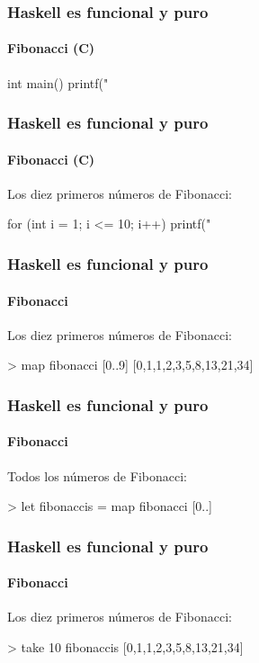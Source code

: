 \documentclass[spanish]{beamer}
\begin{document}

\begin{frame}[fragile]
  \frametitle{Haskell es funcional y puro}
  \framesubtitle{Fibonacci (C)}

  \begin{code}
int main() {
  printf("%
}
  \end{code}
\end{frame}


\begin{frame}[fragile]
  \frametitle{Haskell es funcional y puro}
  \framesubtitle{Fibonacci (C)}

  Los diez primeros números de Fibonacci:
  \begin{code}
for (int i = 1; i <= 10; i++) {
  printf("%
}
  \end{code}
\end{frame}


\begin{frame}[fragile]
  \frametitle{Haskell es funcional y puro}
  \framesubtitle{Fibonacci}

  Los diez primeros números de Fibonacci:
  \begin{code}
> map fibonacci [0..9]
[0,1,1,2,3,5,8,13,21,34]
  \end{code}
\end{frame}


\begin{frame}[fragile]
  \frametitle{Haskell es funcional y puro}
  \framesubtitle{Fibonacci}

  Todos los números de Fibonacci:
  \begin{code}
> let fibonaccis = map fibonacci [0..]
  \end{code}
\end{frame}


\begin{frame}[fragile]
  \frametitle{Haskell es funcional y puro}
  \framesubtitle{Fibonacci}

  Los diez primeros números de Fibonacci:
  \begin{code}
> take 10 fibonaccis
[0,1,1,2,3,5,8,13,21,34]
  \end{code}
\end{frame}
\end{document}
